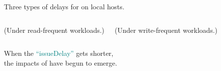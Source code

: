\begin{frame}{}
  \centerline{Three types of delays for  on local hosts.}
  \begin{center}
    
  \end{center}

  
\end{frame}

\begin{frame}{}
  \begin{columns}
      \vspace{-0.40cm}
      \centerline{\footnotesize (Under read-frequent workloads.)}
      \vspace{-0.40cm}
      \centerline{\footnotesize (Under write-frequent workloads.)}
  \end{columns}

  \vspace{0.40cm}
  \begin{center}
    When the \textcolor{teal}{``issueDelay''} gets shorter, \\
    the impacts of \red{$\konebv$} have begun to emerge.
  \end{center}
\end{frame}

% 

